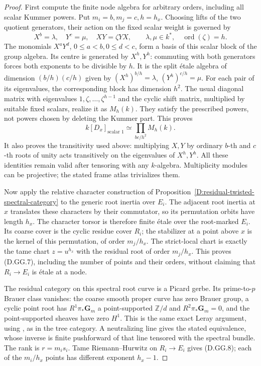 \begin{proof}
First compute the finite node algebra for arbitrary
orders, including all scalar Kummer powers. Put
\(m_i=b,m_j=c,h=h_x\). Choosing lifts of the two
quotient generators, their action on the fixed scalar
weight is governed by
\[
 X^b=\lambda,\quad Y^c=\mu,\quad
 XY=\zeta YX,\qquad \lambda,\mu\in k^*,\quad
             \operatorname{ord}(\zeta)=h.             \tag{D.GG.11}
\]
The monomials \(X^aY^d\), \(0\leq a<b,0\leq d<c\),
form a basis of this scalar block of the group algebra.
Its centre is generated by \(X^h,Y^h\): commuting with
both generators forces both exponents to be divisible
by \(h\). It is the split étale algebra of dimension
\((b/h)(c/h)\) given by
\((X^h)^{b/h}=\lambda\), \((Y^h)^{c/h}=\mu\).
For each pair of its eigenvalues, the corresponding
block has dimension \(h^2\). The usual diagonal
matrix with eigenvalues \(1,\zeta,\ldots,\zeta^{h-1}\)
and the cyclic shift matrix, multiplied by suitable
fixed scalars, realize it as \(M_h(k)\).
They satisfy the prescribed powers, not powers chosen
by deleting the Kummer part. This proves
\[
        k[D_x]_{\text{scalar }1}
               \simeq\prod_{bc/h^2}M_h(k).             \tag{D.GG.12}
\]
It also proves the transitivity used above: multiplying
\(X,Y\) by ordinary \(b\)-th and \(c\)-th roots of unity
acts transitively on the eigenvalues of \(X^h,Y^h\).
All these identities remain valid after tensoring
with any \(k\)-algebra. Multiplicity modules can be
projective; the stated frame atlas trivializes them.

Now apply the relative character construction of
Proposition~\ref{D:residual-twisted-spectral-category}
to the generic root inertia over \(E_i\).
The adjacent root inertia at \(x\) translates these
characters by their commutator, so its permutation
orbits have length \(h_x\). The character torsor is
therefore finite étale over the root-marked \(E_i\).
Its coarse cover is the cyclic residue cover \(R_i\);
the stabilizer at a point above \(x\) is the kernel
of this permutation, of order \(m_j/h_x\).
The strict-local chart is exactly the tame chart
\(z=u^{h_x}\) with the residual root of order
\(m_j/h_x\). This proves (D.GG.7), including the number
of points and their orders, without claiming that
\(R_i\to E_i\) is étale at a node.

The residual category on this spectral root curve
is a Picard gerbe. Its prime-to-\(p\) Brauer class
vanishes: the coarse smooth proper curve has zero
Brauer group, a cyclic point root has
\(R^1\pi_*\mathbf G_m\) a point-supported
\(\mathbb Z/d\) and \(R^2\pi_*\mathbf G_m=0\), and
the point-supported sheaves have zero \(H^1\).
This is the same exact Leray argument, using
\citet[Lemmas4.1.1--4.1.3 and Proposition4.1.4]
{Lieblich2011ResidualD}, as in the tree category.
A neutralizing line gives the stated equivalence,
whose inverse is finite pushforward of that line
tensored with the spectral bundle. The rank is
\(r=m_i s_i\). Tame Riemann--Hurwitz on \(R_i\to E_i\)
gives (D.GG.8); each of the \(m_i/h_x\) points has
different exponent \(h_x-1\).


\end{proof}
